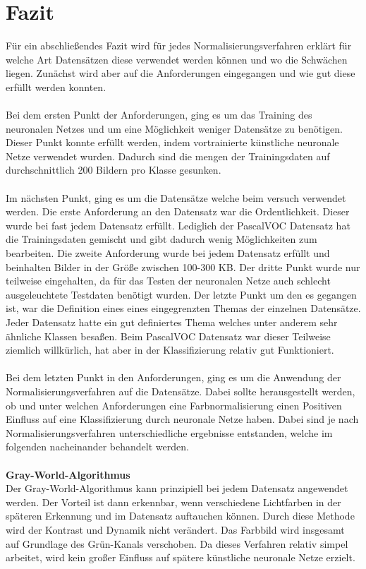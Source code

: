 \chapter{Fazit}\label{s.fazit}
Für ein abschließendes Fazit wird für jedes Normalisierungsverfahren erklärt für welche Art Datensätzen diese verwendet werden können und wo die Schwächen liegen. Zunächst wird aber auf die Anforderungen eingegangen und wie gut diese erfüllt werden konnten.\\\\
Bei dem ersten Punkt der Anforderungen, ging es um das Training des neuronalen Netzes und um eine Möglichkeit weniger Datensätze zu benötigen. Dieser Punkt konnte erfüllt werden, indem vortrainierte künstliche neuronale Netze verwendet wurden. Dadurch sind die mengen der Trainingsdaten auf durchschnittlich 200 Bildern pro Klasse gesunken.\\\\
Im nächsten Punkt, ging es um die Datensätze welche beim versuch verwendet werden. Die erste Anforderung an den Datensatz war die Ordentlichkeit. Dieser wurde bei fast jedem Datensatz erfüllt. Lediglich der PascalVOC Datensatz hat die Trainingsdaten gemischt und gibt dadurch wenig Möglichkeiten zum bearbeiten. Die zweite Anforderung wurde bei jedem Datensatz erfüllt und beinhalten Bilder in der Größe zwischen 100-300 KB. Der dritte Punkt wurde nur teilweise eingehalten, da für das Testen der neuronalen Netze auch schlecht ausgeleuchtete Testdaten benötigt wurden. Der letzte Punkt um den es gegangen ist, war die Definition eines eines eingegrenzten Themas der einzelnen Datensätze. Jeder Datensatz hatte ein gut definiertes Thema welches unter anderem sehr ähnliche Klassen besaßen. Beim PascalVOC Datensatz war dieser Teilweise ziemlich willkürlich, hat aber in der Klassifizierung relativ gut Funktioniert.\\\\
Bei dem letzten Punkt in den Anforderungen, ging es um die Anwendung der Normalisierungsverfahren auf die Datensätze. Dabei sollte herausgestellt werden, ob und unter welchen Anforderungen eine Farbnormalisierung einen Positiven Einfluss auf eine Klassifizierung durch neuronale Netze haben. Dabei sind je nach Normalisierungsverfahren unterschiedliche ergebnisse entstanden, welche im folgenden nacheinander behandelt werden.\\\\
\textbf{Gray-World-Algorithmus}\\
Der Gray-World-Algorithmus kann prinzipiell bei jedem Datensatz angewendet werden. Der Vorteil ist dann erkennbar, wenn verschiedene Lichtfarben in der späteren Erkennung und im Datensatz auftauchen können. Durch diese Methode wird der Kontrast und Dynamik nicht verändert. Das Farbbild wird insgesamt auf Grundlage des Grün-Kanals verschoben. Da dieses Verfahren relativ simpel arbeitet, wird kein großer Einfluss auf spätere künstliche neuronale Netze erzielt.\\\\
